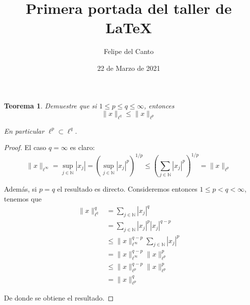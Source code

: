 \documentclass{article}
\title{Primera portada del taller de \LaTeX}
\author{Felipe del Canto}
\date{22 de Marzo de 2021}
\newtheorem{teo}{Teorema}
\begin{document}

\begin{titlepage}
\thispagestyle{empty}
\maketitle
\end{titlepage}

\begin{teo} Demuestre que si $1 \leq p \leq q \leq \infty$, entonces
	$$\|x\|_{\ell^{q}} \leq \|x\|_{\ell^{p}}$$
	
En particular $\ell^{p} \subset \ell^{q}$.
\end{teo}

\begin{proof} El caso $q = \infty$ es claro:
	$$\|x\|_{\ell^{\infty}} 
		= 	\sup_{j \in \mathbb{N}} |x_{j}|
		= 	\left(\sup_{j \in \mathbb{N}} |x_{j}|^{p}\right)^{1/p} 
		\leq	\left(\sum_{j \in \mathbb{N}} |x_{j}|^{p}\right)^{1/p} = \|x\|_{\ell^{p}}
	$$

Además, si $p = q$ el resultado es directo. Consideremos entonces $1 \leq p < q < \infty$, tenemos que
	\begin{align*}
		\|x\|_{\ell^{q}}^{q}
			&=		\sum_{j \in \mathbb{N}} |x_{j}|^{q}	\\
			&=		\sum_{j \in \mathbb{N}} |x_{j}|^{p} |x_{j}|^{q-p}	\\
			&\leq		\|x\|^{q-p}_{\ell^{\infty}} \sum_{j \in \mathbb{N}} |x_{j}|^{p}	\\
			&=		\|x\|^{q-p}_{\ell^{\infty}} \|x\|_{\ell^{p}}^{p}	\\
			&\leq		\|x\|^{q-p}_{\ell^{p}} \|x\|_{\ell^{p}}^{p}	\\
			&=		\|x\|_{\ell^{p}}^{q}		 
	\end{align*}

De donde se obtiene el resultado.
\end{proof}                                          
\end{document}
